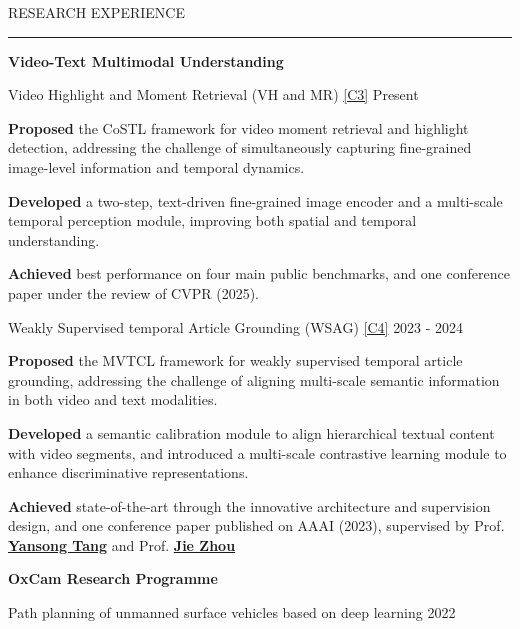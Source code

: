 \documentclass{resume} %
\renewenvironment{rSection}[1]{
\sectionskip
\textcolor{TsinghuaPurple}{\MakeUppercase{#1}}
\sectionlineskip
\hrule
\begin{list}{}{
\setlength{\leftmargin}{0em}
}
\item[]
}{
\end{list}
}
\begin{document}
\begin{rSection}{RESEARCH EXPERIENCE}
\textbf{\large{\textcolor{darkpurple}{Video-Text Multimodal Understanding}}}\vspace{5pt}\\
\begin{rSubsection}{Video Highlight and Moment Retrieval (VH and MR) \hyperref[c3]{[C3]}} {Present}{}{}
    \item \textbf{Proposed} the CoSTL framework for video moment retrieval and highlight detection, addressing the challenge of simultaneously capturing fine-grained image-level information and temporal dynamics.
    \item \textbf{Developed} a two-step, text-driven fine-grained image encoder and a multi-scale temporal perception module, improving both spatial and temporal understanding.
    \item \textbf{Achieved} best performance on four main public benchmarks, and one conference paper under the review of CVPR (2025).
\end{rSubsection}\vspace{-8pt}
\begin{rSubsection}{Weakly Supervised temporal Article Grounding (WSAG) \hyperref[c4]{[C4]}} {2023 - 2024}{}{}
    \item \textbf{Proposed} the MVTCL framework for weakly supervised temporal article grounding, addressing the challenge of aligning multi-scale semantic information in both video and text modalities.
    \item \textbf{Developed} a semantic calibration module to align hierarchical textual content with video segments, and introduced a multi-scale contrastive learning module to enhance discriminative representations.
    \item \textbf{Achieved} state-of-the-art through the innovative architecture and supervision design, and one conference paper published on AAAI (2023), supervised by  Prof. \href{https://andytang15.github.io/}{\textbf{Yansong Tang}} and Prof. \href{https://scholar.google.com/citations?user=6a79aPwAAAAJ&hl=en}{\textbf{Jie Zhou}}
\end{rSubsection}
\vspace{5pt}
\textbf{\large{\textcolor{darkpurple}{OxCam Research Programme}}}\vspace{5pt}\\
\begin{rSubsection}{Path planning of unmanned surface vehicles based on deep learning} {2022}{}{}

\end{rSubsection}
\end{rSection}
\end{document}
